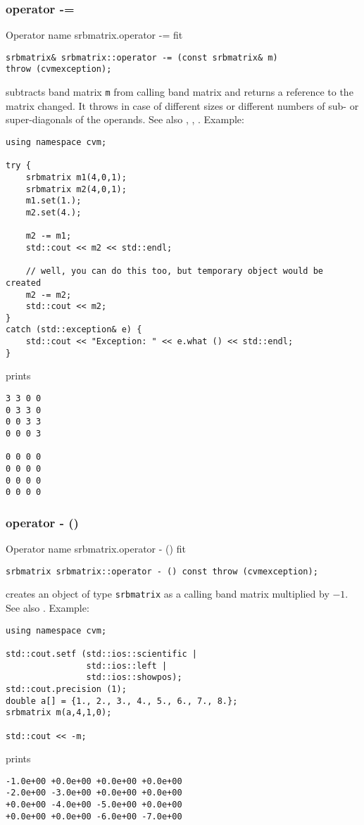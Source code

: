 \subsubsection{operator -=}
Operator%
\pdfdest name {srbmatrix.operator -=} fit
\begin{verbatim}
srbmatrix& srbmatrix::operator -= (const srbmatrix& m) 
throw (cvmexception);
\end{verbatim}
subtracts  band matrix \verb"m" from  calling band matrix
and returns a reference to
the matrix changed.
It throws  
in case of different sizes or different numbers of sub- or super-diagonals
of the operands.
See also ,
,
.
Example:
\begin{Verbatim}
using namespace cvm;

try {
    srbmatrix m1(4,0,1);
    srbmatrix m2(4,0,1);
    m1.set(1.);
    m2.set(4.);

    m2 -= m1;
    std::cout << m2 << std::endl;

    // well, you can do this too, but temporary object would be created
    m2 -= m2; 
    std::cout << m2;
}
catch (std::exception& e) {
    std::cout << "Exception: " << e.what () << std::endl;
}
\end{Verbatim}
prints
\begin{Verbatim}
3 3 0 0
0 3 3 0
0 0 3 3
0 0 0 3

0 0 0 0
0 0 0 0
0 0 0 0
0 0 0 0
\end{Verbatim}
\newpage





\subsubsection{operator - ()}
Operator%
\pdfdest name {srbmatrix.operator - ()} fit
\begin{verbatim}
srbmatrix srbmatrix::operator - () const throw (cvmexception);
\end{verbatim}
creates an object of type \verb"srbmatrix" as
a calling band matrix multiplied by $-1$.
See also .
Example:
\begin{Verbatim}
using namespace cvm;

std::cout.setf (std::ios::scientific | 
                std::ios::left | 
                std::ios::showpos); 
std::cout.precision (1);
double a[] = {1., 2., 3., 4., 5., 6., 7., 8.};
srbmatrix m(a,4,1,0);

std::cout << -m;
\end{Verbatim}
prints
\begin{Verbatim}
-1.0e+00 +0.0e+00 +0.0e+00 +0.0e+00
-2.0e+00 -3.0e+00 +0.0e+00 +0.0e+00
+0.0e+00 -4.0e+00 -5.0e+00 +0.0e+00
+0.0e+00 +0.0e+00 -6.0e+00 -7.0e+00
\end{Verbatim}
\newpage




